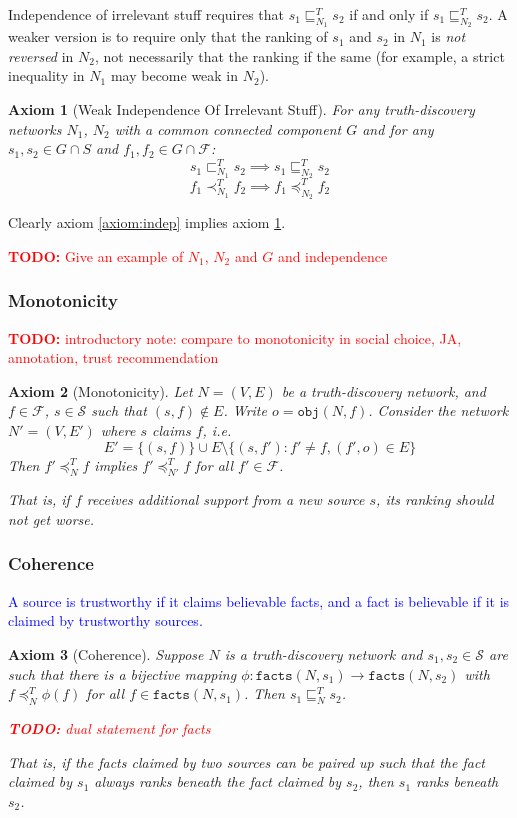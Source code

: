 \documentclass{article}
\theoremstyle{definition} \newtheorem{definition}{Definition}
\theoremstyle{definition} \newtheorem{example}{Example}
\theoremstyle{plain} \newtheorem{axiom}{Axiom}
\theoremstyle{plain} \newtheorem*{remark}{Remark}
\theoremstyle{remark} \newtheorem*{notation}{Notation}
\theoremstyle{plain} \newtheorem{lemma}{Lemma}
\theoremstyle{plain} \newtheorem{theorem}{Theorem}
\theoremstyle{plain} \newtheorem{proposition}{Proposition}
\newcommand{\todo}[1] {
    \textcolor{red}{
        \textbf{TODO:} #1
    }
}
\newcommand{\rough}[1] {
    \textcolor{blue}{
        #1
    }
}
\renewcommand{\S}{\mathcal{S}}  %
\newcommand{\F}{\mathcal{F}}
\newcommand{\sle}{\sqsubseteq}
\newcommand{\slt}{\sqsubset}
\newcommand{\fle}{\preceq}
\newcommand{\flt}{\prec}
\newcommand{\fact}{\texttt{facts}}
\newcommand{\obj}{\texttt{obj}}
\begin{document}
Independence of irrelevant stuff requires that $s_1 \sle_{N_1}^T s_2$ if and
only if $s_1 \sle_{N_2}^T s_2$. A weaker version is to require only that the
ranking of $s_1$ and $s_2$ in $N_1$ is \emph{not reversed} in $N_2$, not
necessarily that the ranking if the same (for example, a strict inequality in
$N_1$ may become weak in $N_2$).

\begin{axiom}[Weak Independence Of Irrelevant Stuff]
\label{axiom:weak_indep}
For any truth-discovery networks $N_1$, $N_2$ with a common connected component
$G$ and for any $s_1, s_2 \in G \cap S$ and $f_1, f_2 \in G \cap \F$:
\[
    s_1 \slt_{N_1}^T s_2 \implies s_1 \sle_{N_2}^T s_2
\]
\[
    f_1 \flt_{N_1}^T f_2 \implies f_1 \fle_{N_2}^T f_2
\]
\end{axiom}

Clearly axiom \ref{axiom:indep} implies axiom \ref{axiom:weak_indep}.

\todo{Give an example of $N_1$, $N_2$ and $G$ and independence}

\subsubsection{Monotonicity}

\todo{introductory note: compare to monotonicity in social choice, JA,
annotation, trust recommendation}

\begin{axiom}[Monotonicity]
Let $N = (V, E)$ be a truth-discovery network, and $f \in \F$, $s \in \S$ such
that $(s, f) \notin E$. Write $o = \obj(N, f)$. Consider the network $N'=(V,
E')$ where $s$ claims $f$, i.e.
$$
    E' = \{(s, f)\} \cup E \setminus \{(s, f') : f' \ne f, (f', o) \in E\}
$$
Then $f' \fle_N^T f$ implies $f' \fle_{N'}^T f$ for all $f' \in \F$.

That is, if $f$ receives additional support from a new source $s$, its ranking
should not get worse.
\end{axiom}

\subsubsection{Coherence}

\rough{
    A source is trustworthy if it claims believable facts, and a fact is
    believable if it is claimed by trustworthy sources.
}

\begin{axiom}[Coherence]
Suppose $N$ is a truth-discovery network and $s_1, s_2 \in \S$ are such that
there is a bijective mapping $\phi: \fact(N, s_1) \rightarrow \fact(N, s_2)$
with $f \fle_N^T \phi(f)$ for all $f \in \fact(N, s_1)$. Then $s_1 \sle_N^T
s_2$.

\todo{dual statement for facts}

That is, if the facts claimed by two sources can be paired up such that the
fact claimed by $s_1$ always ranks beneath the fact claimed by $s_2$, then
$s_1$ ranks beneath $s_2$.
\end{axiom}
\end{document}
